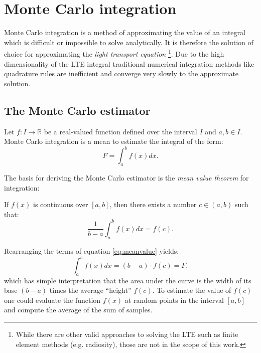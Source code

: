 \chapter{Monte Carlo integration}
\label{ch:montecarlo}
Monte Carlo integration is a method of approximating the value of an integral which is difficult or impossible to solve analytically. It is therefore the solution of choice for approximating the \emph{light transport equation} \footnote{While there are other valid approaches to solving the LTE such as finite element methods (e.g. radiosity), those are not in the scope of this work.}. Due to the high dimensionality of the LTE integral traditional numerical integration methods like quadrature rules are inefficient and converge very slowly to the approximate solution.

\section{The Monte Carlo estimator}
Let $f: I \rightarrow \mathbb{R}$ be a real-valued function defined over the interval $I$ and $a,b \in I$. Monte Carlo integration is a mean to estimate the integral of the form:
\begin{equation}
  F = \int_{a}^{b} f(x)dx.
\end{equation}

The basis for deriving the Monte Carlo estimator is the \emph{mean value theorem} for integration:
\begin{thm}
If $f(x)$ is continuous over $[a, b]$, then there exists a number $c \in (a, b)$ such that:
\begin{equation}
\label{eq:meanvalue}
  \frac{1}{b-a} \int_{a}^{b} f(x)dx = f(c).
\end{equation}
\end{thm}
Rearranging the terms of equation \ref{eq:meanvalue} yields:
\begin{equation}
  \int_{a}^{b} f(x)dx = (b-a) \cdot f(c) = F,
\end{equation}
which has simple interpretation that the area under the curve is the width of its base $(b-a)$ times the average ``height'' $f(c)$. To estimate the value of $f(c)$ one could evaluate the function $f(x)$ at random points in the interval $[a,b]$ and compute the average of the sum of samples.

